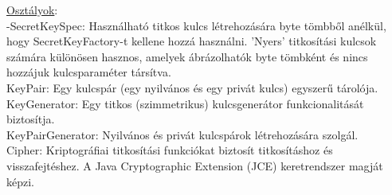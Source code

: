 \noindent \underline{Osztályok}:
\vspace{5pt}\\-SecretKeySpec: Használható titkos kulcs létrehozására byte tömbből anélkül, hogy SecretKeyFactory-t kellene hozzá használni. ’Nyers’ titkosítási kulcsok számára különösen hasznos, amelyek ábrázolhatók byte tömbként és nincs hozzájuk kulcsparaméter társítva.
\vspace{5pt}\\KeyPair: Egy kulcspár (egy nyilvános és egy privát kulcs) egyszerű tárolója.
\vspace{5pt}\\KeyGenerator: Egy titkos (szimmetrikus) kulcsgenerátor funkcionalitását biztosítja.
\vspace{5pt}\\KeyPairGenerator: Nyilvános és privát kulcspárok létrehozására szolgál.
\vspace{5pt}\\Cipher: Kriptográfiai titkosítási funkciókat biztosít titkosításhoz és visszafejtéshez. A Java Cryptographic Extension (JCE) keretrendszer magját képzi. \newline

